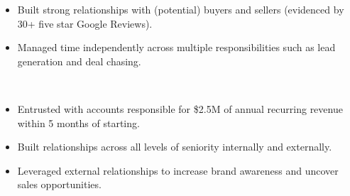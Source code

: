 \begin{itemize}
    \item Built strong relationships with (potential) buyers and sellers (evidenced by 30+ five star Google Reviews).
\smallskip
    \item Managed time independently across multiple responsibilities such as lead generation and deal chasing.
\end{itemize}
\divider \\

\begin{itemize}
    \item Entrusted with accounts responsible for \$2.5M of annual recurring revenue within 5 months of starting. 
\smallskip
    \item Built relationships across all levels of seniority internally and externally. 
    \item Leveraged external relationships to increase brand awareness and uncover sales opportunities. 
\end{itemize}




 



